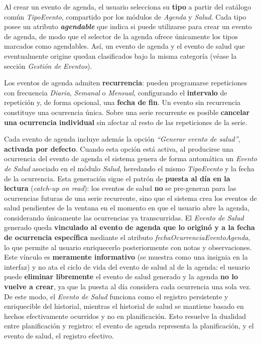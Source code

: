 \documentclass[a4paper,12pt]{article}
\begin{document}
    \par Al crear un evento de agenda, el usuario selecciona su \textbf{tipo} a partir del catálogo común \textit{TipoEvento}, compartido por los módulos de \textit{Agenda} y \textit{Salud}. Cada tipo posee un atributo \textbf{\textit{agendable}} que indica si puede utilizarse para crear un evento de agenda, de modo que el selector de la agenda ofrece únicamente los tipos marcados como agendables. Así, un evento de agenda y el evento de salud que eventualmente origine quedan clasificados bajo la misma categoría (véase la sección \textit{Gestión de Eventos}).
    \par Los eventos de agenda admiten \textbf{recurrencia}: pueden programarse repeticiones con frecuencia \textit{Diaria}, \textit{Semanal} o \textit{Mensual}, configurando el \textbf{intervalo} de repetición y, de forma opcional, una \textbf{fecha de fin}. Un evento sin recurrencia constituye una ocurrencia única. Sobre una serie recurrente es posible \textbf{cancelar una ocurrencia individual} sin afectar al resto de las repeticiones de la serie.
    \par Cada evento de agenda incluye además la opción \textit{“Generar evento de salud”}, \textbf{activada por defecto}. Cuando esta opción está activa, al producirse una ocurrencia del evento de agenda el sistema genera de forma automática un \textit{Evento de Salud} asociado en el módulo \textit{Salud}, heredando el mismo \textit{TipoEvento} y la fecha de la ocurrencia. Esta generación sigue el patrón de \textbf{puesta al día en la lectura} (\textit{catch-up on read}): los eventos de salud \textbf{no} se pre-generan para las ocurrencias futuras de una serie recurrente, sino que el sistema crea los eventos de salud pendientes de la ventana en el momento en que el usuario abre la agenda, considerando únicamente las ocurrencias ya transcurridas. El \textit{Evento de Salud} generado queda \textbf{vinculado al evento de agenda que lo originó y a la fecha de ocurrencia específica} mediante el atributo \textit{fechaOcurrenciaEventoAgenda}, lo que permite al usuario enriquecerlo posteriormente con notas y observaciones. Este vínculo es \textbf{meramente informativo} (se muestra como una insignia en la interfaz) y no ata el ciclo de vida del evento de salud al de la agenda: el usuario puede \textbf{eliminar libremente} el evento de salud generado y la agenda \textbf{no lo vuelve a crear}, ya que la puesta al día considera cada ocurrencia una sola vez. De este modo, el \textit{Evento de Salud} funciona como el registro persistente y enriquecible del historial, mientras el historial de salud se mantiene basado en hechos efectivamente ocurridos y no en planificación. Esto resuelve la dualidad entre planificación y registro: el evento de agenda representa la planificación, y el evento de salud, el registro efectivo.
\end{document}

